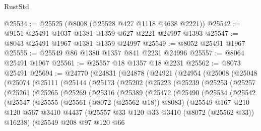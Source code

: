 \begin{lexlean}{RustStd}
\begin{coremodule}
@25534 := @25525 (@8008 (@25528 @427 @1118 @4638 @2221))
@25542 := @9151 @25491 @1037 @1381 @1359 @627 @2221 @24997 @1393
@25547 := @8043 @25491 @1967 @1381 @1359 @24997
@25549 := @8052 @25491 @1967
@25555 := @25549 @86 @1380 @1357 @841 @2231 @24996
@25557 := @8064 @25491 @1967
@25561 := @25557 @18 @1357 @18 @2231
@25562 := @8073 @25491
@25694 := @24770
    (@24831
      (@24878
        (@24921
          (@24954
            (@25008
              (@25048
                (@25074
                  (@25111
                    (@25144
                      (@25173
                        (@25202
                          (@25223
                            (@25239
                              (@25253
                                (@25257
                                  (@25261
                                    (@25265
                                      (@25269
                                        (@25316
                                          (@25389
                                            (@25472
                                              (@25490
                                                (@25534
                                                  (@25542
                                                    (@25547
                                                      (@25555
                                                        (@25561 (@8072 (@25562 @18)) @8083)
                                                        (@25549
                                                          @167
                                                          @210
                                                          @120
                                                          @567
                                                          @3410
                                                          @4437
                                                          (@25557
                                                            @33
                                                            @120
                                                            @33
                                                            @3410
                                                            (@8072 (@25562 @33))
                                                            @16238)
                                                          (@25549
                                                            @208
                                                            @97
                                                            @120
                                                            @66

\end{coremodule}
\end{lexlean}
